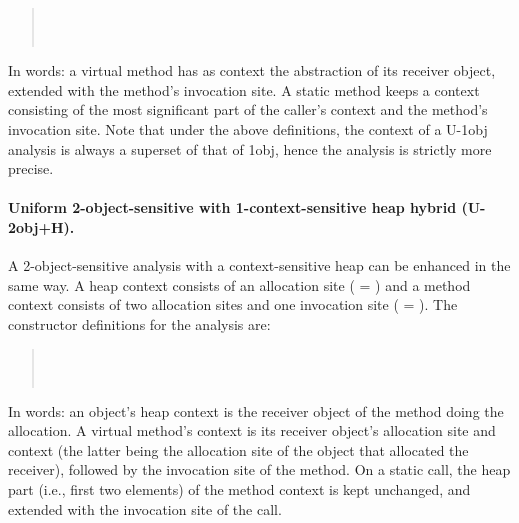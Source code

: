 \begin{quote}
 \\
 \\
\end{quote}

In words: a virtual method has as context the abstraction of its receiver object, extended with the method's invocation site.  A static method keeps a context consisting of the most significant part of the caller's context and the method's invocation site. Note that under the above definitions, the context of a U-1obj analysis is always a superset of that of 1obj, hence the analysis is strictly more precise.

\paragraph[Uniform 2-object-sensitive with 1-context-sensitive heap]{Uniform 2-object-sensitive with 1-context-sensitive heap hybrid (U-2obj+H).}
A 2-object-sensitive analysis with a context-sensitive heap can be enhanced in the same way. A heap context consists of an allocation site ( = ) and a method context consists of two allocation sites and one invocation site ( = ).  The constructor definitions for the analysis are:

\begin{quote}
 \\
 \\
\end{quote}

In words: an object's heap context is the receiver object of the method doing the allocation. A virtual method's context is its receiver object's allocation site and context (the latter being the allocation site of the object that allocated the receiver), followed by the invocation site of the method. On a static call, the heap part (i.e., first two elements) of the method context is kept unchanged, and extended with the invocation site of the call.


